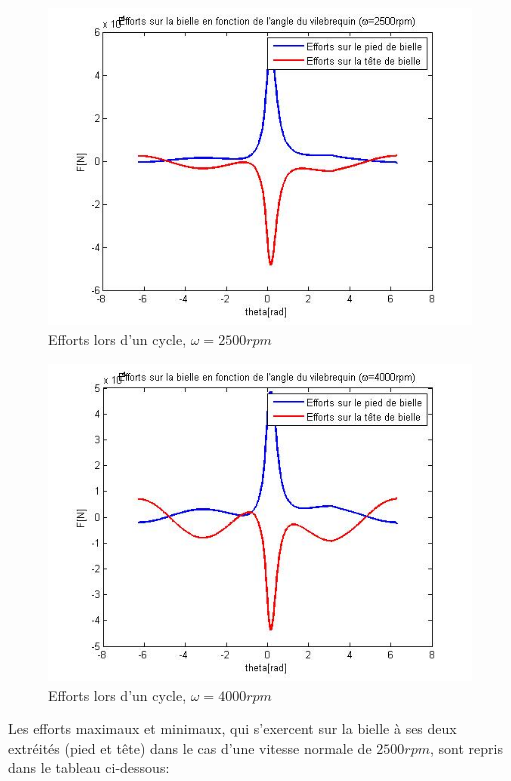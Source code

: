 \documentclass[a4paper,oneside,12pt]{report}
\begin{document}
\begin{figure}[H]
\center
\includegraphics[scale=0.7]{effort_2500rpm.jpg}
\caption{Efforts lors d'un cycle, $\omega=2500rpm$}
\end{figure}

\begin{figure}[H]
\center
\includegraphics[scale=0.7]{effort_4000rpm.jpg}
\caption{Efforts lors d'un cycle, $\omega=4000rpm$}
\end{figure}

Les efforts maximaux et minimaux, qui s'exercent sur la bielle à ses deux extréités (pied et tête) dans le cas d'une vitesse normale de $2500rpm$, sont repris dans le tableau ci-dessous: \\
\end{document}
